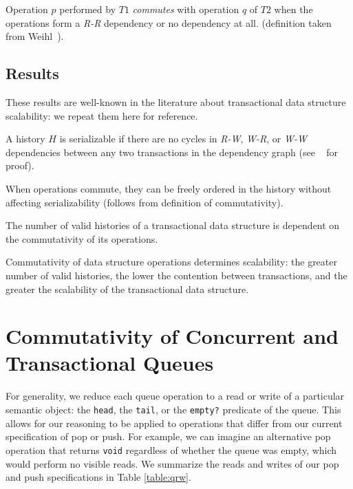 \begin{defn}
    Operation $p$ performed by $T1$ \emph{commutes} with operation $q$ of $T2$ when the operations form a \emph{R-R} dependency or no dependency at all.
(definition taken from Weihl~\cite{weihl}).
\end{defn}

\subsection{Results}

These results are well-known in the literature about transactional data structure scalability: we repeat them here for reference.
\begin{theorem}
    A history $H$ is serializable if there are no cycles in \emph{R-W}, \emph{W-R}, or \emph{W-W} dependencies between any two transactions in the dependency graph (see ~\cite{schwarz} for proof).
\end{theorem}

\begin{theorem}
    When operations commute, they can be freely ordered in the history without affecting serializability (follows from definition of commutativity).
\end{theorem}

\begin{corollary}
    The number of valid histories of a transactional data structure is dependent on the commutativity of its operations.
\end{corollary}

\begin{corollary}
    Commutativity of data structure operations determines scalability: the greater number of valid histories, the lower the contention between transactions, and the greater the scalability of the transactional data structure. 
\end{corollary}

\section{Commutativity of Concurrent and Transactional Queues}

For generality, we reduce each queue operation to a read or write of a particular semantic object: the \texttt{head}, the \texttt{tail}, or the \texttt{empty?} predicate of the queue. This allows for our reasoning to be applied to operations that differ from our current specification of pop or push. For example, we can imagine an alternative pop operation that returns \texttt{void} regardless of whether the queue was empty, which would perform no visible reads. We summarize the reads and writes of our pop and push specifications in Table \ref{table:qrw}.

